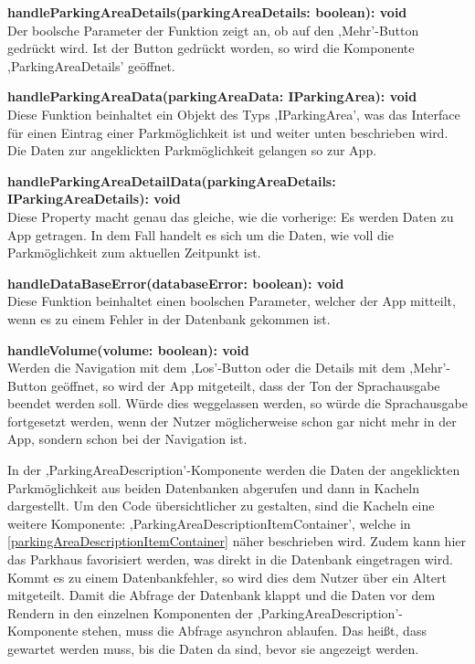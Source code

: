 \begin{description}
	\item \textbf{handleParkingAreaDetails(parkingAreaDetails: boolean): void} \\ Der boolsche Parameter der Funktion zeigt an, ob auf den ,Mehr'-Button gedrückt wird. Ist der Button gedrückt worden, so wird die Komponente ,ParkingAreaDetails' geöffnet.
	\item \textbf{handleParkingAreaData(parkingAreaData: IParkingArea): void} \\ Diese Funktion beinhaltet ein Objekt des Typs ,IParkingArea', was das Interface für einen Eintrag einer Parkmöglichkeit ist und weiter unten beschrieben wird. Die Daten zur angeklickten Parkmöglichkeit gelangen so zur App.
	\item \textbf{handleParkingAreaDetailData(parkingAreaDetails: IParkingAreaDetails): void} \\ Diese Property macht genau das gleiche, wie die vorherige: Es werden Daten zu App getragen. In dem Fall handelt es sich um die Daten, wie voll die Parkmöglichkeit zum aktuellen Zeitpunkt ist.
	\item \textbf{handleDataBaseError(databaseError: boolean): void} \\ Diese Funktion beinhaltet einen boolschen Parameter, welcher der App mitteilt, wenn es zu einem Fehler in der Datenbank gekommen ist.
	\item \textbf{handleVolume(volume: boolean): void} \\ Werden die Navigation mit dem ,Los'-Button oder die Details mit dem ,Mehr'-Button geöffnet, so wird der App mitgeteilt, dass der Ton der Sprachausgabe beendet werden soll. Würde dies weggelassen werden, so würde die Sprachausgabe fortgesetzt werden, wenn der Nutzer möglicherweise schon gar nicht mehr in der App, sondern schon bei der Navigation ist.
\end{description}

In der ,ParkingAreaDescription'-Komponente werden die Daten der angeklickten Parkmöglichkeit aus beiden Datenbanken abgerufen und dann in Kacheln dargestellt. Um den Code übersichtlicher zu gestalten, sind die Kacheln eine weitere Komponente: ,ParkingAreaDescriptionItemContainer', welche in \autoref{parkingAreaDescriptionItemContainer} näher beschrieben wird. Zudem kann hier das Parkhaus favorisiert werden, was direkt in die Datenbank eingetragen wird. Kommt es zu einem Datenbankfehler, so wird dies dem Nutzer über ein Altert mitgeteilt. Damit die Abfrage der Datenbank klappt und die Daten vor dem Rendern in den einzelnen Komponenten der ,ParkingAreaDescription'-Komponente stehen, muss die Abfrage asynchron ablaufen. Das heißt, dass gewartet werden muss, bis die Daten da sind, bevor sie angezeigt werden.

